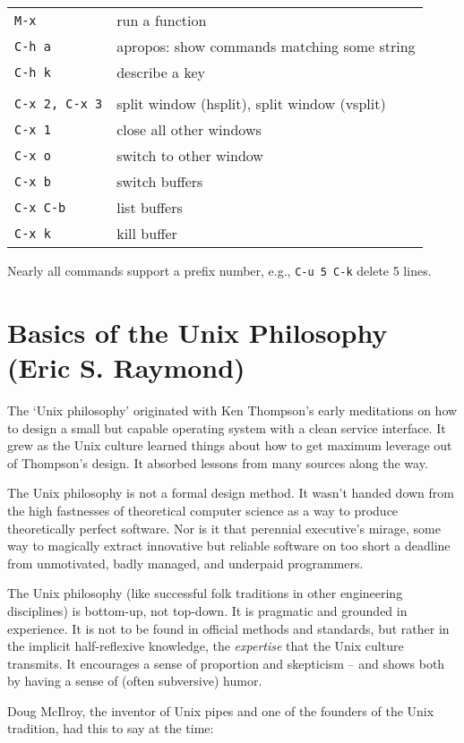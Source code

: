 \documentclass[10pt,twoside,openright]{memoir}
\begin{document}
{\begin{tabular}{ll}
\texttt{M-x} & run a function \\
\texttt{C-h a} & apropos: show commands matching some string \\
\texttt{C-h k} & describe a key \\
& \\
\texttt{C-x 2, C-x 3} & split window (hsplit), split window (vsplit) \\
\texttt{C-x 1} & close all other windows \\
\texttt{C-x o} & switch to other window \\
\texttt{C-x b} & switch buffers \\
\texttt{C-x C-b} & list buffers \\
\texttt{C-x k} & kill buffer \\
\end{tabular}

\vskip 0.1in
\noindent
Nearly all commands support a prefix number, e.g., \texttt{C-u 5 C-k} delete 5 lines.
}



\chapter{Basics of the Unix Philosophy (Eric S. Raymond)}

The `Unix philosophy' originated with Ken Thompson's early meditations on how to design a small but capable operating system with a clean service interface. It grew as the Unix culture learned things about how to get maximum leverage out of Thompson's design. It absorbed lessons from many sources along the way.

The Unix philosophy is not a formal design method. It wasn't handed down from the high fastnesses of theoretical computer science as a way to produce theoretically perfect software. Nor is it that perennial executive's mirage, some way to magically extract innovative but reliable software on too short a deadline from unmotivated, badly managed, and underpaid programmers.

The Unix philosophy (like successful folk traditions in other engineering disciplines) is bottom-up, not top-down. It is pragmatic and grounded in experience. It is not to be found in official methods and standards, but rather in the implicit half-reflexive knowledge, the \emph{expertise} that the Unix culture transmits. It encourages a sense of proportion and skepticism -- and shows both by having a sense of (often subversive) humor.

Doug McIlroy, the inventor of Unix pipes and one of the founders of the Unix tradition, had this to say at the time:
\end{document}
